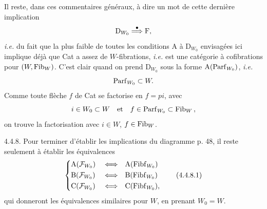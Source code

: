 Il reste, dans ces commentaires généraux, à dire un mot de cette dernière implication
\[
\mathrm{D}_{W_0} \overset{\bullet}{\Longrightarrow} \mathrm{F},
\]
\textit{i.e.} du fait que la plus faible de toutes les conditions A à $\mathrm{D}_{W_0}$ envisagées ici implique déjà que Cat a assez de $W$-fibrations, \textit{i.e.} est une catégorie à cofibrations pour $(W, \mathrm{Fib}_W)$. C'est clair quand on prend $\mathrm{D}_{W_0}$ sous la forme $\mathrm{A}(\mathrm{Parf}_{W_0})$, \textit{i.e.}
\[
\mathrm{Parf}_{W_0} \subset W.
\]
Comme toute flèche $f$ de Cat se factorise en $f = pi$, avec
\[
i \in W_0 \subset W \quad\text{et}\quad f \in \Parf_{W_0} \subset \Fib_W\, , %
\]
on trouve la factorisation avec $i \in W$, $f \in \mathrm{Fib}_W$. %

4.4.8. Pour terminer d'établir les implications du diagramme p. 48, il reste seulement à établir les équivalences
\[
\left\{
\begin{aligned}
&\mathrm{A}(\mathcal{F}_{W_0}) &&\Longleftrightarrow &&\mathrm{A}(\Fibf_{W_0})\\
&\mathrm{B}(\mathcal{F}_{W_0}) &&\Longleftrightarrow &&\mathrm{B}(\Fibf_{W_0})\\
&\mathrm{C}(\mathcal{F}_{W_0}) &&\Longleftrightarrow &&\mathrm{C}(\Fibf_{W_0}),
\end{aligned}
\right.
\tag*{(4.4.8.1)}
\]
qui donneront les équivalences similaires pour $W$, en prenant $W_0 = W$.

